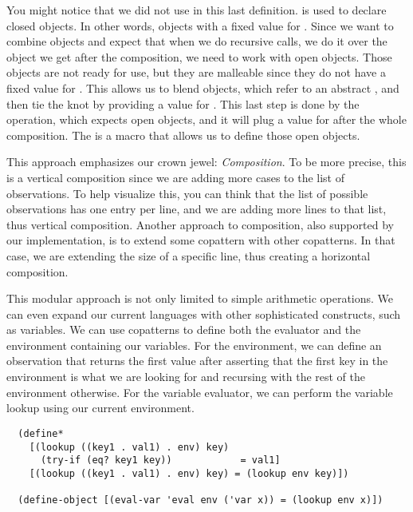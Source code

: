 You might notice that we did not use  in this last definition.  is used to declare closed objects.
In other words, objects with a fixed value for . 
Since we want to combine objects and expect that when we do recursive calls, we do it over the object we get after the composition, we need to work with open objects.
Those objects are not ready for use, but they are malleable since they do not have a fixed value for .
This allows us to blend objects, which refer to an abstract , and then tie the knot by providing a value for .
This last step is done by the  operation, which expects open objects, and it will plug a value for  after the whole composition.
The  is a macro that allows us to define those open objects.

This approach emphasizes our crown jewel: \emph{Composition}.
To be more precise, this is a vertical composition since we are adding more cases to the list of observations.
To help visualize this, you can think that the list of possible observations has one entry per line, and we are adding more lines to that list, thus vertical composition.
Another approach to composition, also supported by our implementation, is to extend some copattern with other copatterns.
In that case, we are extending the size of a specific line, thus creating a horizontal composition.

This modular approach is not only limited to simple arithmetic operations.
We can even expand our current languages with other sophisticated constructs, such as variables.
We can use copatterns to define both the evaluator and the environment containing our variables.
For the environment, we can define an observation that returns the first value after asserting that the first key in the environment is what we are looking for and recursing with the rest of the environment otherwise.
For the variable evaluator, we can perform the variable lookup using our current environment.

\begin{verbatim}
  (define*
    [(lookup ((key1 . val1) . env) key)
      (try-if (eq? key1 key))            = val1]
    [(lookup ((key1 . val1) . env) key) = (lookup env key)])

  (define-object [(eval-var 'eval env ('var x)) = (lookup env x)])
\end{verbatim}


